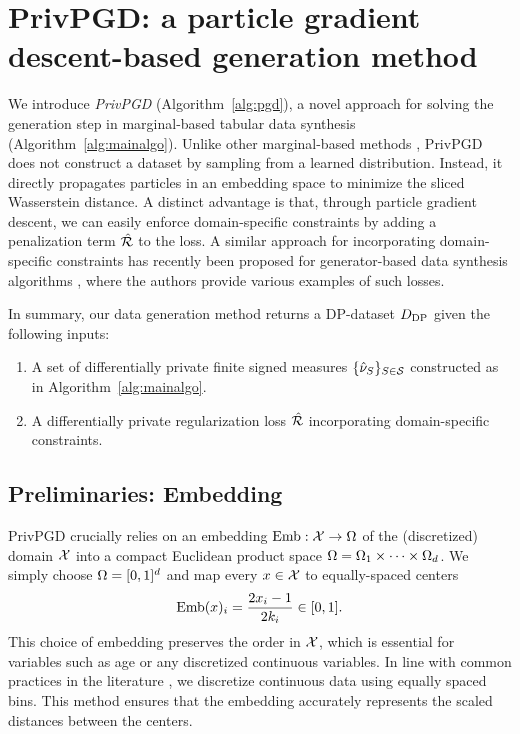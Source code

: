 

\section{PrivPGD: a particle gradient descent-based generation method}

We introduce \textit{PrivPGD} (Algorithm~\ref{alg:pgd}), a novel approach for solving the generation step in marginal-based tabular data synthesis (Algorithm~\ref{alg:mainalgo}).
Unlike other marginal-based methods \citep{zhang2017privbayes,mckenna2019graphical}, PrivPGD does not construct a dataset by sampling from a learned distribution. Instead, it directly propagates particles in an embedding space to minimize the sliced Wasserstein distance. A distinct advantage is that, through particle gradient descent, we can easily enforce domain-specific constraints by adding a penalization term $\hat {\mathcal R}$ to the loss. A similar approach for incorporating domain-specific constraints has recently been proposed for generator-based data synthesis algorithms \citep{vero2023programmable}, where the authors provide various examples of such losses. 

In summary, our data generation method returns a DP-dataset $D_{\text{DP}}$ given the following inputs:
\begin{enumerate}
\item A set of differentially private finite signed measures {$ \{\hat \nu_{S}\}_{ S \in \mathcal S}$}  constructed as in Algorithm~\ref{alg:mainalgo}.
    \item  A differentially private regularization loss $\hat {\mathcal R}$ incorporating domain-specific constraints.
    \end{enumerate}



\subsection{Preliminaries: Embedding}
\label{sec:embedding}
PrivPGD crucially relies on an embedding ${\text{Emb}: \mathcal X \to \Omega}$ of the (discretized) domain $\mathcal X$ into a compact Euclidean product space $\Omega= \Omega_1 \times \cdots \times \Omega_d$.
We simply choose $\Omega = [0,1]^d$ and map every $x \in \mathcal X$ to equally-spaced centers
\begin{equation}
\label{eq:embedding}
    \text{Emb}(x)_i = \frac{ 2 x_i -  1}{2 k_i} \in [0,1].
\end{equation}
This choice of embedding preserves the order in $\mathcal X$, which is essential for variables such as age or any discretized continuous variables. In line with common practices in the literature \citep{mst,tao2021benchmarking}, we discretize continuous data using equally spaced bins. This method ensures that the embedding accurately represents the scaled distances between the centers.

